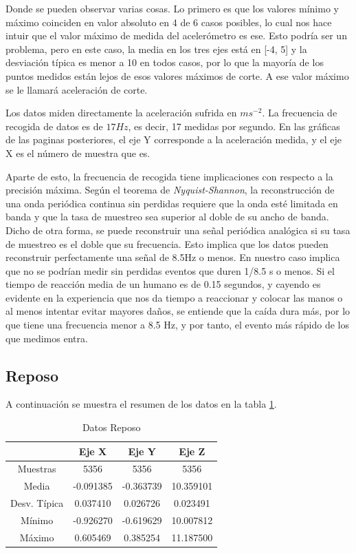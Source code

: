 \documentclass[12pt]{book}
\numberwithin{equation}{section}
\begin{document}
Donde se pueden observar varias cosas. Lo primero es que los valores mínimo y máximo coinciden en valor absoluto en 4 de 6 casos posibles, lo cual nos hace intuir que el valor máximo de medida del acelerómetro es ese. Esto podría ser un problema, pero en este caso, la media en los tres ejes está en [-4, 5] y la desviación típica es menor a 10 en todos casos, por lo que la mayoría de los puntos medidos están lejos de esos valores máximos de corte.  A ese valor máximo se le llamará aceleración de corte.

Los datos miden directamente la aceleración sufrida en $m s^{-2}$. La frecuencia de recogida de datos es de $17Hz$, es decir, 17 medidas por segundo. En las gráficas de las paginas posteriores, el eje Y corresponde a la aceleración medida, y el eje X es el número de muestra que es.

Aparte de esto, la frecuencia de recogida tiene implicaciones con respecto a la precisión máxima. Según el teorema de \textit{Nyquist-Shannon}, la reconstrucción de una onda periódica continua sin perdidas requiere que la onda esté limitada en banda y que la tasa de muestreo sea superior al doble de su ancho de banda. Dicho de otra forma, se puede reconstruir una señal periódica analógica si su tasa de muestreo es el doble que su frecuencia. Esto implica que los datos pueden reconstruir perfectamente una señal de 8.5Hz o menos. En nuestro caso implica que no se podrían medir sin perdidas eventos que duren 1/8.5 s o menos. Si el tiempo de reacción media de un humano es de 0.15 segundos, y cayendo es evidente en la experiencia que nos da tiempo a reaccionar y colocar las manos o al menos intentar evitar mayores daños, se entiende que la caída dura más, por lo que tiene una frecuencia menor a 8.5 Hz, y por tanto, el evento más rápido de los que medimos entra.

\subsection{Reposo}

A continuación se muestra el resumen de los datos en la tabla \ref{tabla3}.

\begin{table}
\centering
\caption{Datos Reposo}
\begin{tabular}{| c | c | c | c |}
\hline
 & Eje X & Eje Y & Eje Z \\
\hline
Muestras & 5356 & 5356 & 5356 \\
\hline
Media & -0.091385 & -0.363739 & 10.359101 \\
\hline
Desv. Típica & 0.037410 & 0.026726 & 0.023491 \\
\hline
Mínimo & -0.926270 & -0.619629 & 10.007812 \\
\hline
Máximo & 0.605469 & 0.385254 & 11.187500 \\
\hline
\end{tabular}
\label{tabla3}
\end{table}
\end{document}
